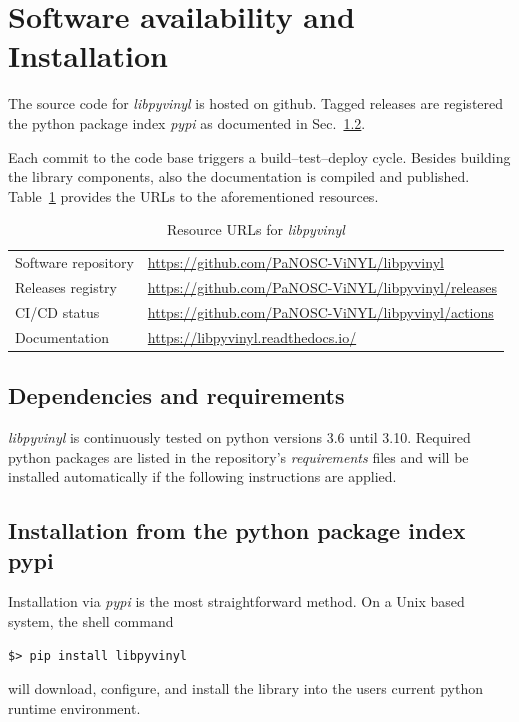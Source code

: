 \documentclass[10pt]{scrartcl}
\begin{document}
\section{Software availability and Installation}
\label{sec:installation}
The source code for \textit{libpyvinyl} is hosted on github.
Tagged releases are registered 
the python package index \textit{pypi} as documented in Sec.~\ref{sec:pypi}.

Each commit to the code base triggers a build--test--deploy cycle. 
Besides building the library components, also the documentation is compiled
and published. Table~\ref{tab:links} provides the URLs to the aforementioned
resources.

\begin{table}[ht]
  \centering
  \begin{tabular}{l|l}
 Software repository &   \url{https://github.com/PaNOSC-ViNYL/libpyvinyl} \\
 Releases registry &   \url{https://github.com/PaNOSC-ViNYL/libpyvinyl/releases} \\
 CI/CD status &   \url{https://github.com/PaNOSC-ViNYL/libpyvinyl/actions} \\
 Documentation &    \url{https://libpyvinyl.readthedocs.io/}
  \end{tabular}
  \caption{Resource URLs for \textit{libpyvinyl}}
  \label{tab:links}
\end{table}
 

\subsection{Dependencies and requirements}
\label{sec:dep}

\textit{libpyvinyl} is continuously tested on python versions 3.6 until 3.10.
Required python packages are listed in the repository's \textit{requirements}
files and will be installed automatically if the following instructions are applied.

\subsection{Installation from the python package index pypi}
\label{sec:pypi}

Installation via \textit{pypi} is the most straightforward method. On a Unix based
system, the shell command
\begin{verbatim}
$> pip install libpyvinyl
\end{verbatim}
will download, configure, and install the library into the users current python
runtime environment.
\end{document}
